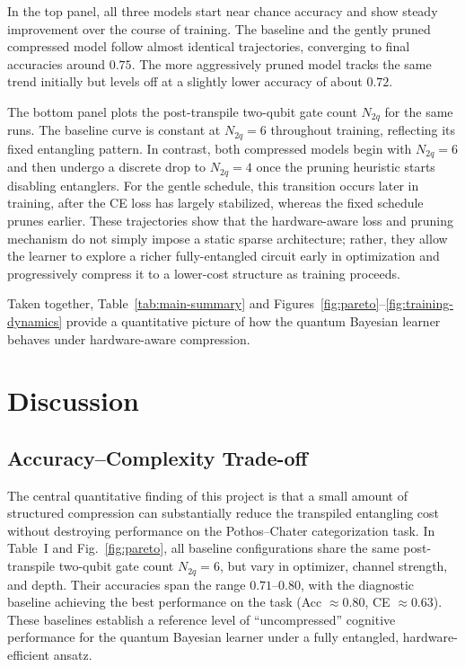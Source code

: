 \documentclass[conference]{IEEEtran}
\begin{document}
In the top panel, all three models start near chance accuracy and show steady
improvement over the course of training. The baseline and the gently pruned
compressed model follow almost identical trajectories, converging to final
accuracies around $0.75$. The more aggressively pruned model tracks the same
trend initially but levels off at a slightly lower accuracy of about $0.72$.

The bottom panel plots the post-transpile two-qubit gate count $N_{2q}$ for the
same runs. The baseline curve is constant at $N_{2q}=6$ throughout training,
reflecting its fixed entangling pattern. In contrast, both compressed models
begin with $N_{2q}=6$ and then undergo a discrete drop to $N_{2q}=4$ once the
pruning heuristic starts disabling entanglers. For the gentle schedule, this
transition occurs later in training, after the CE loss has largely stabilized,
whereas the fixed schedule prunes earlier. These trajectories show that the
hardware-aware loss and pruning mechanism do not simply impose a static sparse
architecture; rather, they allow the learner to explore a richer
fully-entangled circuit early in optimization and progressively compress it to
a lower-cost structure as training proceeds.

Taken together, Table~\ref{tab:main-summary} and
Figures~\ref{fig:pareto}--\ref{fig:training-dynamics} provide a quantitative
picture of how the quantum Bayesian learner behaves under hardware-aware
compression.

\section{Discussion}
\label{sec:discussion}

\subsection{Accuracy--Complexity Trade-off}

The central quantitative finding of this project is that a small amount of
structured compression can substantially reduce the transpiled entangling cost
without destroying performance on the Pothos--Chater categorization task.  
In Table~I and Fig.~\ref{fig:pareto}, all baseline configurations share the
same post-transpile two-qubit gate count $N_{2q}=6$, but vary in optimizer,
channel strength, and depth. Their accuracies span the range
$0.71$--$0.80$, with the diagnostic baseline achieving the best performance on
the task (Acc $\approx 0.80$, CE $\approx 0.63$). These baselines establish a
reference level of ``uncompressed'' cognitive performance for the quantum
Bayesian learner under a fully entangled, hardware-efficient ansatz.
\end{document}
